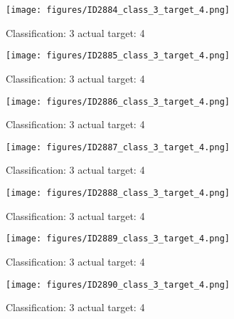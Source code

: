 \begin{figure}[h!]
\begin{center}
\texttt{[image: figures/ID2884\_class\_3\_target\_4.png]}
\end{center}
\caption{ Classification: 3 actual target: 4}
\label{fig:ID2884_class_3_target_4}
\end{figure}
\begin{figure}[h!]
\begin{center}
\texttt{[image: figures/ID2885\_class\_3\_target\_4.png]}
\end{center}
\caption{ Classification: 3 actual target: 4}
\label{fig:ID2885_class_3_target_4}
\end{figure}
\begin{figure}[h!]
\begin{center}
\texttt{[image: figures/ID2886\_class\_3\_target\_4.png]}
\end{center}
\caption{ Classification: 3 actual target: 4}
\label{fig:ID2886_class_3_target_4}
\end{figure}
\begin{figure}[h!]
\begin{center}
\texttt{[image: figures/ID2887\_class\_3\_target\_4.png]}
\end{center}
\caption{ Classification: 3 actual target: 4}
\label{fig:ID2887_class_3_target_4}
\end{figure}
\begin{figure}[h!]
\begin{center}
\texttt{[image: figures/ID2888\_class\_3\_target\_4.png]}
\end{center}
\caption{ Classification: 3 actual target: 4}
\label{fig:ID2888_class_3_target_4}
\end{figure}
\begin{figure}[h!]
\begin{center}
\texttt{[image: figures/ID2889\_class\_3\_target\_4.png]}
\end{center}
\caption{ Classification: 3 actual target: 4}
\label{fig:ID2889_class_3_target_4}
\end{figure}
\begin{figure}[h!]
\begin{center}
\texttt{[image: figures/ID2890\_class\_3\_target\_4.png]}
\end{center}
\caption{ Classification: 3 actual target: 4}
\label{fig:ID2890_class_3_target_4}
\end{figure}

